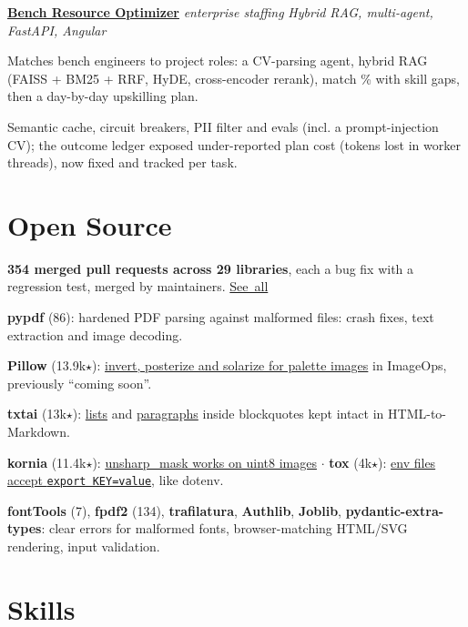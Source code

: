 \documentclass[10pt, letterpaper]{article}
\newcommand{\resumeitem}[1]{\item\small{#1}}
\begin{document}
\noindent\href{https://github.com/RavSinghChandan/ai-engineer/tree/main/bench-resource-optimizer}{\textbf{Bench Resource Optimizer}} \textbar{} \textit{\small enterprise staffing} \hfill \textit{\small\color{subtle}Hybrid RAG, multi-agent, FastAPI, Angular}

\begin{projectitems}
\resumeitem{Matches bench engineers to project roles: a CV-parsing agent, hybrid RAG (FAISS + BM25 + RRF, HyDE, cross-encoder rerank), match \% with skill gaps, then a day-by-day upskilling plan.}
\resumeitem{Semantic cache, circuit breakers, PII filter and evals (incl. a prompt-injection CV); the outcome ledger exposed under-reported plan cost (tokens lost in worker threads), now fixed and tracked per task.}
\end{projectitems}

\section{Open Source}

\noindent\textbf{354 merged pull requests across 29 libraries}, each a bug fix with a regression test, merged by maintainers. \hfill \href{https://github.com/pulls?q=is\%3Apr+author\%3ARavSinghChandan+is\%3Amerged}{See~all}

\begin{projectitems}
\resumeitem{\textbf{pypdf} (86): hardened PDF parsing against malformed files: crash fixes, text extraction and image decoding.}
\resumeitem{\textbf{Pillow} (13.9k$\star$): \href{https://github.com/python-pillow/Pillow/pull/10174}{invert, posterize and solarize for palette images} in ImageOps, previously ``coming soon''.}
\resumeitem{\textbf{txtai} (13k$\star$): \href{https://github.com/neuml/txtai/pull/1422}{lists} and \href{https://github.com/neuml/txtai/pull/1408}{paragraphs} inside blockquotes kept intact in HTML-to-Markdown.}
\resumeitem{\textbf{kornia} (11.4k$\star$): \href{https://github.com/kornia/kornia/pull/5946}{unsharp\_mask works on uint8 images} $\cdot$ \textbf{tox} (4k$\star$): \href{https://github.com/tox-dev/tox/pull/4161}{env files accept \texttt{export KEY=value}}, like dotenv.}
\resumeitem{\textbf{fontTools} (7), \textbf{fpdf2} (134), \textbf{trafilatura}, \textbf{Authlib}, \textbf{Joblib}, \textbf{pydantic-extra-types}: clear errors for malformed fonts, browser-matching HTML/SVG rendering, input validation.}
\end{projectitems}

\section{Skills}
\end{document}
